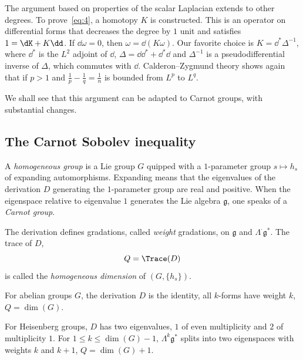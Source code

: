 The argument based on properties of the scalar Laplacian extends to other degrees. To prove~\eqref{eq:4}, a homotopy $K$ is constructed. This is an operator on differential forms that decreases the degree by $1$ unit and satisfies $1=\dK+K\dd$. If $\dd\omega=0$, then $\omega=\dd(K\omega)$. Our favorite choice is $K=\dd^*\Delta^{-1}$, where $\dd^*$ is the $L^2$ adjoint of $\dd$, $\Delta= \dd\dd^*+\dd^*\dd$ and $\Delta^{-1}$ is a pseudodifferential inverse of $\Delta$, which commutes with $\dd$. Calderon--Zygmund theory shows again that if $p>1$ and $\frac{1}{p}-\frac{1}{q}=\frac{1}{n}$ is bounded from $L^p$ to $L^q$.

We shall see that this argument can be adapted to Carnot groups, with substantial changes.

\subsection{The Carnot Sobolev inequality}

A \emph{homogeneous group} is a Lie group $G$ quipped with a $1$-parameter group $s\mapsto h_s$ of expanding automorphisms. Expanding means that the eigenvalues of the derivation $D$ generating the $1$-parameter group are real and positive. When the eigenspace relative to eigenvalue $1$ generates the Lie algebra $\mathfrak{g}$, one speaks of a \emph{Carnot group}.

The derivation defines gradations, called \emph{weight} gradations, on $\mathfrak{g}$ and $\Lambda^\cdot\mathfrak{g}^*$. The trace of $D$,
\begin{equation*}
Q=\Trace(D)
\end{equation*}
is called the \emph{homogeneous dimension} of $(G,\{h_s\})$.

\begin{exem}
For abelian groups $G$, the derivation $D$ is the identity, all $k$-forms have weight $k$, $Q=\dim(G)$.

For Heisenberg groups, $D$ has two eigenvalues, $1$ of even multiplicity and $2$ of multiplicity $1$. For $1\leq k\leq \dim(G)-1$, $\Lambda^k\mathfrak{g}^*$ splits into two eigenspaces with weights $k$ and $k+1$, $Q=\dim(G)+1$.
\end{exem}

